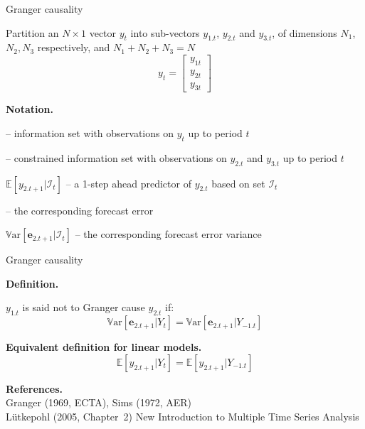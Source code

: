 \documentclass[notes,blackandwhite,mathsans,usenames,dvipsnames]{beamer}
\begin{document}
\begin{frame}{Granger causality}

{\color{mcxs2}Partition an $N\times 1$ vector} $y_t$ {\color{mcxs2}into sub-vectors} $y_{1.t}$, $y_{2.t}$ {\color{mcxs2}and} $y_{3.t}${\color{mcxs2}, of dimensions} $N_1$, $N_2, N_3$ {\color{mcxs2}respectively, and} $N_1 + N_2 + N_3 = N$
$$ y_t = \begin{bmatrix} y_{1t} \\ y_{2t} \\ y_{3t} \end{bmatrix} $$

\small
\textbf{Notation. }
\begin{description}
\item[$Y_t$] {\color{mcxs2}-- information set with observations on} $y_t$ {\color{mcxs2}up to period} $t$
\item[$Y_{-1.t}$] {\color{mcxs2}-- {\color{mcxs1}constrained information set} with observations on }$y_{2.t}$ {\color{mcxs2}and} $y_{3.t}$ {\color{mcxs2}up to period} $t$
\item $\mathbb{E}[y_{2.t+1}|\mathcal{I}_t]$ {\color{mcxs2}-- a 1-step ahead predictor of} $y_{2.t}$ {\color{mcxs2} based on set} $\mathcal{I}_t$
\item[$\mathbf{e}_{2.t+1}$] {\color{mcxs2}-- the corresponding forecast error}
\item $\mathbb{V}\text{ar}[\mathbf{e}_{2.t+1}|\mathcal{I}_t]$ {\color{mcxs2}-- the corresponding forecast error variance}
\end{description}

\end{frame}


\begin{frame}{Granger causality}

\textbf{Definition.}

 $y_{1.t}$ {\color{mcxs2}is said {\color{mcxs1}not to Granger cause}} $y_{2.t}$ {\color{mcxs2}if:}
$$ \mathbb{V}\text{ar}[\mathbf{e}_{2.t+1}|Y_t] = \mathbb{V}\text{ar}[\mathbf{e}_{2.t+1}|Y_{-1.t}] $$

\bigskip\textbf{Equivalent definition for linear models.}
$$ \mathbb{E}\left[y_{2.t+1}|Y_t\right] = \mathbb{E}\left[y_{2.t+1}|Y_{-1.t}\right] $$

\bigskip\textbf{References.} \\ \footnotesize
{\color{mcxs2}Granger (1969, ECTA), Sims (1972, AER)\\ L\"utkepohl (2005, Chapter~2) New Introduction to Multiple Time Series Analysis}
\end{frame}
\end{document}
